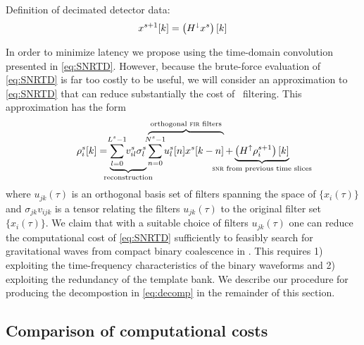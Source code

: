 %
Definition of decimated detector data:
\begin{equation}
	x^{s+1}[k] = \left( H^\shortdownarrow x^s\right)[k]
\end{equation}

In order to minimize latency we propose using the time-domain convolution
presented in \eqref{eq:SNRTD}.  However, because the brute-force evaluation of
\eqref{eq:SNRTD} is far too costly to be useful, we will consider an
approximation to \eqref{eq:SNRTD} that can reduce substantially the cost of
\realtime\ filtering. This approximation has the form
%
%
\begin{equation}
	\rho_i^s [k] =%
		\underbrace{
			\sum_{\mathclap{l=0}}^{\mathclap{L^s-1}} v_{il}^s \sigma_l^s
		}_\textrm{\clap{reconstruction}}
		\overbrace{
			\sum_{\mathclap{n=0}}^{\mathclap{N^s-1}} u_l^s[n] x^s[k-n]
		}^\textrm{\clap{orthogonal {\sc fir} filters}}
		+
		\underbrace{
			\left(H^\uparrow \rho_i^{s+1}\right)[k]
		}_\textrm{\clap{{\sc snr} from previous time slices}}
\end{equation}
%
%
where $u_{jk}(\tau)$ is an orthogonal basis set of filters spanning the space
of $\{x_i(\tau)\}$ and $\sigma_{jk} v_{ijk}$ is a tensor relating the filters
$u_{jk}(\tau)$ to the original filter set $\{x_i(\tau)\}$.  We claim that with
a suitable choice of filters $u_{jk}(\tau)$ one can reduce the computational
cost of \eqref{eq:SNRTD} sufficiently to feasibly search for
gravitational waves from compact binary coalescence in \realtime.  This
requires 1) exploiting
the time-frequency characteristics of the binary waveforms and 2) exploiting the redundancy of the template bank. We describe our
procedure for producing the decompostion in \eqref{eq:decomp} in the remainder
of this section.

\subsection{Comparison of computational costs}

